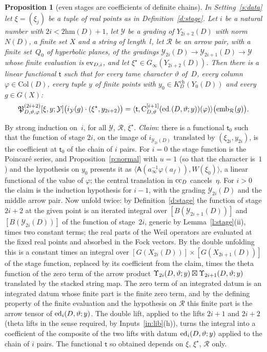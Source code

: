 \documentclass[11pt,a4paper]{article}
\makeatletter
\newcommand{\m}[1]{\mbox{$#1$}}        %
\theoremstyle{plainx}
\newtheorem{proposition}[theorem]{Proposition}
\theoremstyle{uprightx}
\renewenvironment{proof}[1][Proof]{\par\pushQED{\qed}\normalfont\topsep0pt\partopsep0pt
  \trivlist\item[\hskip\labelsep\itshape #1.]\ignorespaces}{\popQED\endtrivlist\@endpefalse}
\newcommand{\ND}[1]{N(#1)}                         %
\newcommand{\rhoD}[1]{\mathrm{hm}(#1)}                 %
\newcommand{\Xs}[2]{X_{#2}(#1)}                    %
\newcommand{\Ys}[2]{Y_{#2}(#1)}                    %
\newcommand{\Col}[1]{\mathrm{Col}(#1)}             %
\newcommand{\Kch}[2]{K^{\mathrm{ch}}_{#1}(#2)}     %
\newcommand{\chnn}[4]{\mathrm{C}^{[#4]}_{#1,#2}(#3)}       %
\newcommand{\gY}[1]{\mathcal{Y}_{#1}(D)}           %
\newcommand{\unf}[6]{\mathfrak{P}^{(#5)}_{D,#1,#2}[#3,#4;#6]} %
\newcommand{\Bes}[1]{B(#1)}                        %
\newcommand{\incl}[1]{i_{#1}}                      %
\newcommand{\coef}[2]{\langle #1,#2\rangle}        %
\makeatother
\begin{document}
\begin{proposition}[even stages are coefficients of definite chains]\label{p:even}
In Setting~\ref{s:data} let \m{\xi=(\xi_j)} be a tuple of real points as in Definition~\ref{d:stage}. Let
$i$ be a natural number with \m{2i<2\rhoD{D}+1}, let $\mathcal{Y}$ be a grading of $\Ys{D}{2i+2}$ with norm
$\ND{D}$, a finite set $X$ and a string of length~$l$, let $\mathcal{R}$ be an arrow pair, with a finite set~$Q_0$
of hyperbolic planes, of the gradings $\gY{2i}\to\gY{2i+1}\to\mathcal{Y}$ whose finite evaluation is
\m{\pairEvalY{i}}, and let $\xi^{\star}\in G_\infty(\Ys{D}{2i+2})$. Then there is a linear functional
$\mathsf{t}$ such that for every tame character $\vartheta$ of~$D$, every column \m{\varphi\in\Col{D}}, every tuple
$y$ of finite points with \m{y_0\in\Kch{D}{\Ys{D}{0}}} and every \m{g\in G(X)}:
\[\unf{\vartheta}{\varphi}{\xi}{y}{2i+2}{\mathcal{Y}}\bigl(\incl{\mathcal{Y}}(g)\cdot(\xi^{\star},y_{2i+2})\bigr)
=\coef{\mathsf{t}}{\chnn{D}{\vartheta}{\evD{\vartheta}{y}{\cdot}}{i+1}(\varphi)}\bigl(\mathrm{emb}_{\mathcal{R}}(g)\bigr).\]
\end{proposition}
\begin{proof}
By strong induction on~$i$, for all $\mathcal{Y}$, $\mathcal{R}$, $\xi^{\star}$. \emph{Claim}: there is a
functional $\mathsf{t}_0$ such that the function of stage $2i$, on the image of $\incl{\gY{2i}}$ translated by
\m{(\xi_{2i},y_{2i})}, is the coefficient at $\mathsf{t}_0$ of the chain of $i$ pairs. For \m{i=0} the stage function
is the Poincar\'e series, and Proposition~\ref{p:normal} with \m{u=1} (so that the character is~$1$) and the
hypothesis on $y_0$ presents it as $\langle\mathsf{A}(a_\infty^{-1}\varphi(a_f)),W(\xi_0)\rangle$, a linear
functional of the value of $\varphi$; the central translation in \m{\colco{D}} cancels~$\eta$. For \m{i>0} the claim
is the induction hypothesis for \m{i-1}, with the grading $\gY{2i}$ and the middle arrow pair. Now unfold twice:
by Definition~\ref{d:stage} the function of stage \m{2i+2} at the given point is an iterated integral over
$[\Bes{\gY{2i+1}}]$ and $[\Bes{\gY{2i}}]$ of the function of stage~$2i$, generic by Lemma~\ref{l:stage}(ii), times
two constant terms; the real parts of the Weil operators are evaluated at the fixed real points and absorbed in the
Fock vectors. By the double unfolding this is a constant times an integral over
$[G(\Xs{D}{2i})]\times[G(\Xs{D}{2i+1})]$ of the stage function, replaced by its coefficient from the claim, times
the theta function of the zero term of the arrow product $\tUps{\vartheta}{y}{2i}\boxtimes\tUps{\vartheta}{y}{2i+1}$
translated by the stacked string map. The zero term of an integrated datum is an integrated datum whose finite
part is the finite zero term, and by the defining property of the finite evaluation and the hypothesis on
$\mathcal{R}$ this finite part is the arrow tensor of $\evD{\vartheta}{y}{i}$. The double lift, applied to the
lifts \m{2i+1} and \m{2i+2} (theta lifts in the sense required, by Inputs~\ref{in:lib}(h)), turns the integral
into a coefficient of the composite of the two lifts with datum $\evD{\vartheta}{y}{i}$
applied to the chain of $i$ pairs. The functional $\mathsf{t}$ so obtained depends on $\xi$, $\xi^{\star}$,
$\mathcal{R}$ only.
\end{proof}
\end{document}

